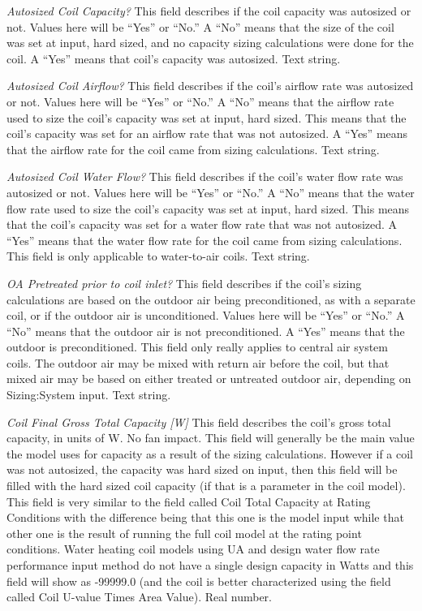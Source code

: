 \emph{Autosized Coil Capacity?} This field describes if the coil capacity was autosized or not.  Values here will be ``Yes'' or ``No.''  A ``No'' means that the size of the coil was set at input, hard sized, and no capacity sizing calculations were done for the coil. A ``Yes'' means that coil's capacity was autosized. Text string.

\emph{Autosized Coil Airflow?} This field describes if the coil's airflow rate was autosized or not. Values here will be ``Yes'' or ``No.''  A ``No'' means that the airflow rate used to size the coil's capacity was set at input, hard sized.  This means that the coil's capacity was set for an airflow rate that was not autosized. A ``Yes'' means that the airflow rate for the coil came from sizing calculations. Text string.

\emph{Autosized Coil Water Flow?} This field describes if the coil's water flow rate was autosized or not. Values here will be ``Yes'' or ``No.''  A ``No'' means that the water flow rate used to size the coil's capacity was set at input, hard sized.  This means that the coil's capacity was set for a water flow rate that was not autosized. A ``Yes'' means that the water flow rate for the coil came from sizing calculations.  This field is only applicable to water-to-air coils. Text string.

\emph{OA Pretreated prior to coil inlet?} This field describes if the coil's sizing calculations are based on the outdoor air being preconditioned, as with a separate coil, or if the outdoor air is unconditioned. Values here will be ``Yes'' or ``No.''  A ``No'' means that the outdoor air is not preconditioned.  A ``Yes'' means that the outdoor is preconditioned.  This field only really applies to central air system coils.  The outdoor air may be mixed with return air before the coil, but that mixed air may be based on either treated or untreated outdoor air, depending on Sizing:System input.  Text string.

\emph{Coil Final Gross Total Capacity [W]} This field describes the coil's gross total capacity, in units of W.  No fan impact.  This field will generally be the main value the model uses for capacity as a result of the sizing calculations.  However if a coil was not autosized, the capacity was hard sized on input, then this field will be filled with the hard sized coil capacity (if that is a parameter in the coil model).  This field is very similar to the field called Coil Total Capacity at Rating Conditions with the difference being that this one is the model input while that other one is the result of running the full coil model at the rating point conditions.  Water heating coil models using UA and design water flow rate performance input method do not have a single design capacity in Watts and this field will show as -99999.0 (and the coil is better characterized using the field called Coil U-value Times Area Value).  Real number. 

